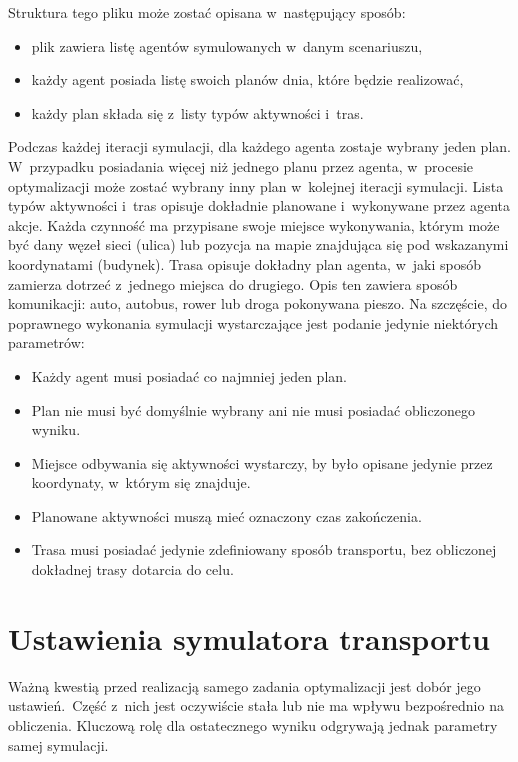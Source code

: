\documentclass[twoside,12pt]{report}
\begin{document}
Struktura tego pliku może zostać opisana w~następujący sposób:
\begin{itemize}
\item plik zawiera listę agentów symulowanych w~danym scenariuszu,
\item każdy agent posiada listę swoich planów dnia, które będzie realizować,
\item każdy plan składa się z~listy typów aktywności i~tras.
\end{itemize}

Podczas każdej iteracji symulacji, dla każdego agenta zostaje wybrany jeden plan. W~przypadku posiadania więcej niż jednego planu przez agenta, w~procesie optymalizacji może zostać wybrany inny plan w~kolejnej iteracji symulacji. Lista typów aktywności i~tras opisuje dokładnie planowane i~wykonywane przez agenta akcje. Każda czynność ma przypisane swoje miejsce wykonywania, którym może być dany węzeł sieci (ulica) lub pozycja na mapie znajdująca się pod wskazanymi koordynatami (budynek). Trasa opisuje dokładny plan agenta, w~jaki sposób zamierza dotrzeć z~jednego miejsca do drugiego. Opis ten zawiera sposób komunikacji: auto, autobus, rower lub droga pokonywana pieszo. Na szczęście, do poprawnego wykonania symulacji wystarczające jest podanie jedynie niektórych parametrów:

\begin{itemize}
\item Każdy agent musi posiadać co najmniej jeden plan.
\item Plan nie musi być domyślnie wybrany ani nie musi posiadać obliczonego wyniku.
\item Miejsce odbywania się aktywności wystarczy, by było opisane jedynie przez koordynaty, w~którym się znajduje.
\item Planowane aktywności muszą mieć oznaczony czas zakończenia.
\item Trasa musi posiadać jedynie zdefiniowany sposób transportu, bez obliczonej dokładnej trasy dotarcia do celu.
\end{itemize}

\section{Ustawienia symulatora transportu}\label{rozdz.ustawienia_symulatora}
Ważną kwestią przed realizacją samego zadania optymalizacji jest dobór jego ustawień.~Część z~nich jest oczywiście stała lub nie ma wpływu bezpośrednio na obliczenia. Kluczową rolę dla ostatecznego wyniku odgrywają jednak parametry samej symulacji.
\end{document}

